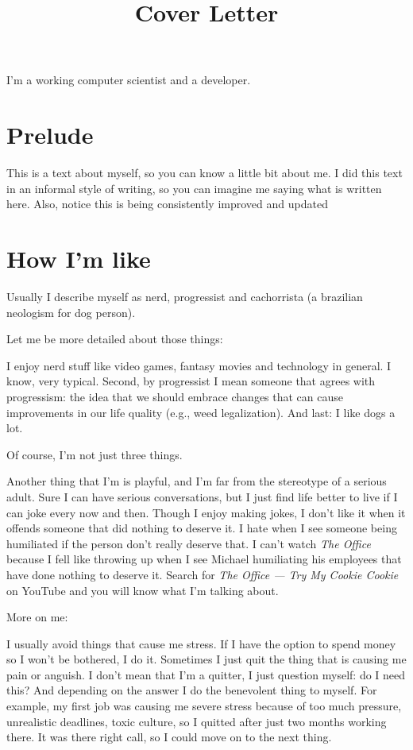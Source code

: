 \documentclass[11pt,a4paper,sans]{moderncv}
\title{Cover Letter}
\begin{document}
\makecvtitle %
I'm a working computer scientist and a developer.

\section{Prelude}
This is a text about myself, so you can know a little bit about me.
I did this text in an informal style of writing, so you can imagine me saying what is written here.
Also, notice this is being consistently improved and updated

\section{How I'm like}
Usually I describe myself as nerd, progressist and cachorrista (a brazilian neologism for dog person).

Let me be more detailed about those things:

I enjoy nerd stuff like video games, fantasy movies and technology in general.
I know, very typical.
Second, by progressist I mean someone that agrees with progressism: the idea that we should embrace changes that can cause improvements in our life quality (e.g., weed legalization).
And last: I like dogs a lot.

\medskip

Of course, I'm not just three things.

\medskip

Another thing that I'm is playful, and I'm far from the stereotype of a serious adult.
Sure I can have serious conversations, but I just find life better to live if I can joke every now and then.
Though I enjoy making jokes, I don't like it when it offends someone that did nothing to deserve it.
I hate when I see someone being humiliated if the person don't really deserve that.
I can't watch \textit{The Office} because I fell like throwing up when I see Michael humiliating his employees that have done nothing to deserve it.
Search for \textit{The Office — Try My Cookie Cookie} on YouTube and you will know what I'm talking about.

\medskip

More on me:

\medskip

I usually avoid things that cause me stress.
If I have the option to spend money so I won't be bothered, I do it.
Sometimes I just quit the thing that is causing me pain or anguish.
I don't mean that I'm a quitter, I just question myself: do I need this?
And depending on the answer I do the benevolent thing to myself.
For example,  my first job was causing me severe stress because of too much pressure, unrealistic deadlines, toxic culture, so I quitted after just two months working there.
It was there right call, so I could move on to the next thing.
\end{document}
